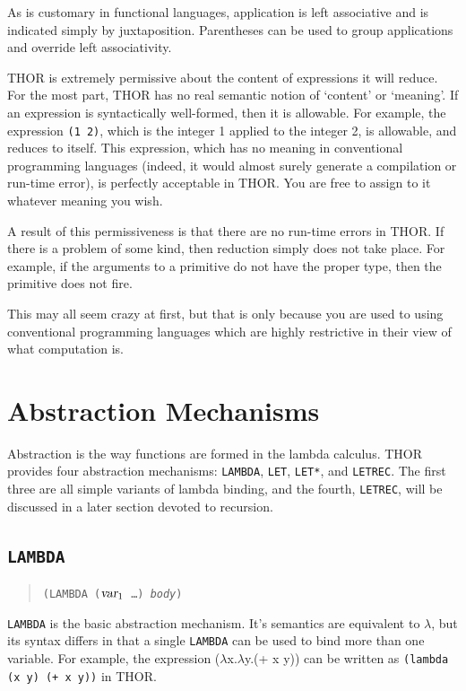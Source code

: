 	As is customary in functional languages, application is 
left associative and is indicated simply by juxtaposition.
Parentheses can be used to group applications and override left associativity.

	THOR is extremely permissive about the content of expressions it
will reduce.  For the most part, THOR has no real semantic notion of 
`content' or `meaning'. If an expression is syntactically well-formed, 
then it is allowable.  For example, the expression {\mbox {\tt (1 2)}}, 
which is the integer 1 applied to the integer 2, is allowable, and
reduces to itself.  This
expression, which has no meaning in conventional programming languages
(indeed, it would almost surely generate a compilation or run-time
error), is perfectly acceptable in THOR.  You are free to assign to it 
whatever meaning you wish.

	A result of this permissiveness is that there are no run-time errors 
in THOR.  If there is a problem of some kind, then reduction simply does
not take place.  For example, if the arguments to a primitive do not
have the proper type, then the primitive does not fire.  

	This may all seem
crazy at first, but that is only because you are used to using conventional
programming languages which are highly restrictive in their view of what
computation is.  


\section{Abstraction Mechanisms}

		Abstraction is the way functions are formed in the lambda
calculus.  THOR provides four abstraction mechanisms:  {\tt LAMBDA}, 
{\tt LET}, {\tt LET*}, and {\tt LETREC}.  The first three are all simple
variants of lambda binding, and the fourth, {\tt LETREC}, will be
discussed in a later section devoted to recursion.

\subsection{\tt LAMBDA}

\begin{quote}
	{\tt (LAMBDA (${\mbox{\sl var}}_1$ \ldots) {\sl body})}
\end{quote}

	{\tt LAMBDA} is the basic abstraction mechanism. It's semantics are 
equivalent to $\lambda$, but its syntax differs in that a single 
{\tt LAMBDA} can be used to bind more than one variable.  For example, 
the expression 
{\mbox ($\lambda$x.$\lambda$y.(+ x y))} can be written as 
{\mbox{\tt (lambda (x y) (+ x y))}} in THOR.

